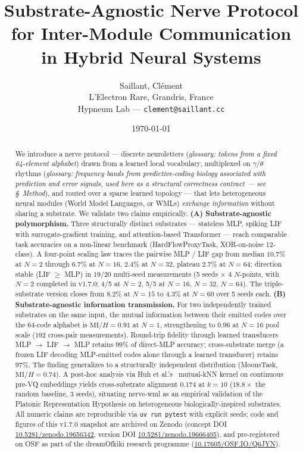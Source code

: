 \documentclass[10pt,twocolumn]{article}
\title{Substrate-Agnostic Nerve Protocol \\
       for Inter-Module Communication in Hybrid Neural Systems}
\author{Saillant, Clément\\
  \small L'Electron Rare, Grandris, France\\
  \small Hypneum Lab --- \texttt{clement@saillant.cc}}
\date{\today}
\begin{document}
\maketitle

\begin{abstract}
We introduce a nerve protocol --- discrete neuroletters
(\emph{glossary: tokens from a fixed 64-element alphabet}) drawn
from a learned local vocabulary, multiplexed on $\gamma / \theta$
rhythms (\emph{glossary: frequency bands from predictive-coding
biology associated with prediction and error signals, used here
as a structural correctness contract --- see \S~Method}), and
routed over a sparse learned topology --- that lets heterogeneous
neural modules (World Model Languages, or WMLs) \emph{exchange
information} without sharing a substrate. We validate two claims
empirically. \textbf{(A) Substrate-agnostic polymorphism.} Three
structurally distinct substrates --- stateless MLP, spiking LIF
with surrogate-gradient training, and attention-based Transformer ---
reach comparable task accuracies on a non-linear benchmark
(HardFlowProxyTask, XOR-on-noise 12-class). A four-point scaling law
traces the pairwise MLP / LIF gap from median $10.7\%$ at $N=2$
through $6.7\%$ at $N=16$, $2.4\%$ at $N=32$, plateau $2.7\%$ at
$N=64$; direction stable (LIF $\geq$ MLP) in 19/20 multi-seed
measurements (5 seeds $\times$ 4 $N$-points, with $N=2$ completed
in v1.7.0; 4/5 at $N=2$, 5/5 at $N{=}16$, $N{=}32$, $N{=}64$). The triple-substrate version closes from $8.2\%$ at
$N=15$ to $4.3\%$ at $N=60$ over 5 seeds each.
\textbf{(B) Substrate-agnostic information transmission.} For two
independently trained substrates on the same input, the mutual
information between their emitted codes over the 64-code alphabet
is $\mathrm{MI} / H = 0.91$ at $N=1$, strengthening to $0.96$ at
$N=16$ pool scale (192 cross-pair measurements). Round-trip fidelity
through learned transducers MLP $\to$ LIF $\to$ MLP retains $99\%$
of direct-MLP accuracy; cross-substrate merge (a frozen LIF decoding
MLP-emitted codes alone through a learned transducer) retains
$97\%$. The finding generalizes to a structurally independent
distribution (MoonsTask, $\mathrm{MI} / H = 0.74$). A post-hoc analysis via Huh et al.'s~\cite{huh2024platonic} mutual-kNN kernel on continuous pre-VQ embeddings yields cross-substrate alignment $0.174$ at $k{=}10$ ($18.8\times$ the random baseline, 3 seeds), situating nerve-wml as an empirical validation of the Platonic Representation Hypothesis on heterogeneous biologically-inspired substrates. All numeric claims
are reproducible via \texttt{uv run pytest} with explicit seeds;
code and figures of this v1.7.0 snapshot are archived on Zenodo
(concept DOI \href{https://doi.org/10.5281/zenodo.19656342}{10.5281/zenodo.19656342},
version DOI \href{https://doi.org/10.5281/zenodo.19666405}{10.5281/zenodo.19666405}),
and pre-registered on OSF as part of the dreamOfkiki research
programme (\href{https://doi.org/10.17605/OSF.IO/Q6JYN}{10.17605/OSF.IO/Q6JYN}).
\end{abstract}
\end{document}
